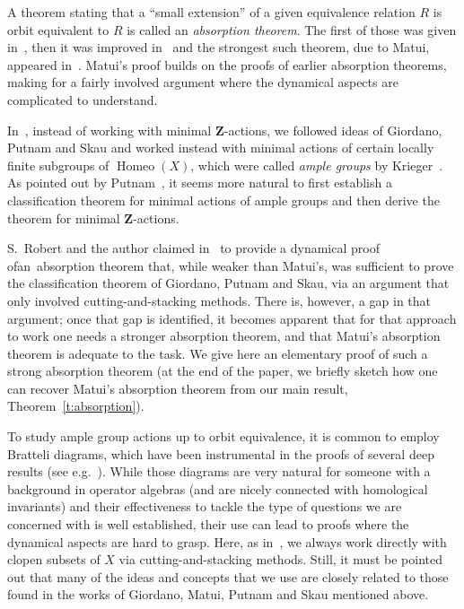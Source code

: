 \documentclass[AHL,Unicode]{cedram}
\DeclareMathOperator{\Homeo}{Homeo}
\newcommand{\Z}{\mathbf{Z}}
\begin{document}
A theorem stating that a ``small extension'' of a given equivalence relation $R$ is orbit equivalent to $R$ is called an \emph{absorption theorem}. The first of those was given in~\cite{Giordano2004}, then it was improved in~\cite{Giordano2008} and the strongest such theorem, due to Matui, appeared in~\cite{Matui2008}. Matui's proof builds on the proofs of earlier absorption theorems, making for a fairly involved argument where the dynamical aspects are complicated to understand.

In~\cite{Melleray2023}, instead of working with minimal $\Z$-actions, we followed ideas of Giordano, Putnam and Skau and worked instead with minimal actions of certain locally finite subgroups of $\Homeo(X)$, which were called \emph{ample groups} by Krieger~\cite{Krieger1979}. As pointed out by Putnam~\cite{Putnam2010}, it seems more natural to first establish a classification theorem for minimal actions of ample groups and then derive the theorem for minimal $\Z$-actions.

S.~Robert and the author claimed in~\cite{Melleray2023} to provide a dynamical proof of\linebreak an~absorption theorem that, while weaker than Matui's, was sufficient to prove the classification theorem of Giordano, Putnam and Skau, via an argument that only involved cutting-and-stacking methods. There is, however, a gap in that argument; once that gap is identified, it becomes apparent that for that approach to work one needs a stronger absorption theorem, and that Matui's absorption theorem is adequate to the task. We give here an elementary proof of such a strong absorption theorem (at the end of the paper, we briefly sketch how one can recover Matui's absorption theorem from our main result, Theorem~\ref{t:absorption}).

To study ample group actions up to orbit equivalence, it is common to employ Bratteli diagrams, which have been instrumental in the proofs of several deep results (see e.g.~\cite{Giordano1995,Giordano2004,
Giordano2008,Matui2008}). While those diagrams are very natural for someone with a background in operator algebras (and are nicely connected with homological invariants) and their effectiveness to tackle the type of questions we are concerned with is well established, their use can lead to proofs where the dynamical aspects are hard to grasp. Here, as in~\cite{Melleray2023}, we always work directly with clopen subsets of $X$ via cutting-and-stacking methods. Still, it must be pointed out that many of the ideas and concepts that we use are closely related to those found in the works of Giordano, Matui, Putnam and Skau mentioned above.
\end{document}
